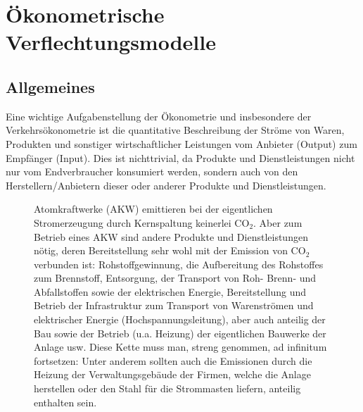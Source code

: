 

\chapter{\label{sec:IOM}\label{sec:verfl}\"Okonometrische
  Verflechtungsmodelle}


\section{Allgemeines}

Eine wichtige Aufgabenstellung der \"Okonometrie und insbesondere der
Verkehrs\"okono\-me\-trie ist die quantitative Beschreibung der
Str\"ome von Waren, Produkten und sonstiger wirtschaftlicher
Leistungen vom Anbieter (Output) zum Empf\"anger (Input).
Dies ist nichttrivial, da 
Produkte und Dienstleistungen
nicht nur vom Endverbraucher konsumiert werden, sondern auch von den
Herstellern/Anbietern  dieser oder anderer Produkte und Dienstleistungen. 


\begin{figure}
\caption{\label{fig:AKW}
Atomkraftwerke (AKW) emittieren bei der eigentlichen
Stromerzeugung durch Kernspaltung keinerlei CO$_2$. Aber zum Betrieb
eines AKW sind andere Produkte und Dienstleistungen n\"otig, deren
Bereitstellung  sehr
wohl mit der Emission von CO$_2$ verbunden ist: Rohstoffgewinnung, die
Aufbereitung des Rohstoffes zum Brennstoff, Entsorgung, der Transport
von Roh- Brenn- und Abfallstoffen sowie der elektrischen Energie, Bereitstellung und Betrieb der
Infrastruktur zum Transport von Warenstr\"omen und elektrischer
Energie (Hochspannungsleitung), aber auch anteilig der Bau sowie der Betrieb (u.a. Heizung)
der eigentlichen Bauwerke der Anlage usw. Diese 
Kette muss man, streng genommen, ad infinitum fortsetzen: Unter
anderem sollten auch die Emissionen durch die Heizung der
Verwaltungsgeb\"aude der Firmen, welche die Anlage herstellen oder den
Stahl f\"ur die Strommasten liefern, anteilig enthalten sein.
}
\end{figure}

